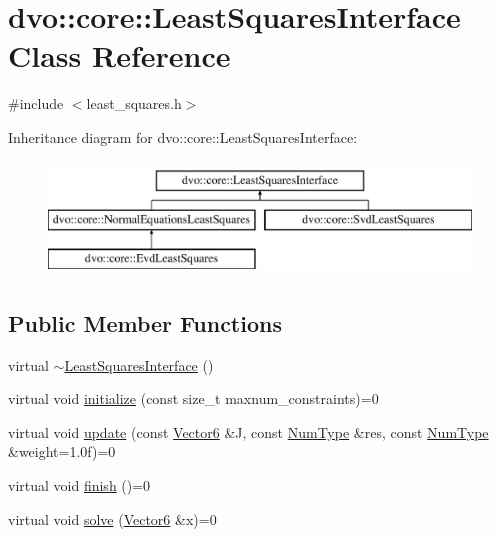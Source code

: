 \hypertarget{classdvo_1_1core_1_1_least_squares_interface}{}\section{dvo\+:\+:core\+:\+:Least\+Squares\+Interface Class Reference}
\label{classdvo_1_1core_1_1_least_squares_interface}


{\ttfamily \#include $<$least\+\_\+squares.\+h$>$}

Inheritance diagram for dvo\+:\+:core\+:\+:Least\+Squares\+Interface\+:\begin{figure}[H]
\begin{center}
\leavevmode
\includegraphics[height=3.000000cm]{classdvo_1_1core_1_1_least_squares_interface}
\end{center}
\end{figure}
\subsection*{Public Member Functions}
\begin{DoxyCompactItemize}
\item 
virtual \mbox{\hyperlink{classdvo_1_1core_1_1_least_squares_interface_afa584f0c27bbcf40a748d678b5295325}{$\sim$\+Least\+Squares\+Interface}} ()
\item 
virtual void \mbox{\hyperlink{classdvo_1_1core_1_1_least_squares_interface_a09e5784f74d7352a9550a8aa523d30d7}{initialize}} (const size\+\_\+t maxnum\+\_\+constraints)=0
\item 
virtual void \mbox{\hyperlink{classdvo_1_1core_1_1_least_squares_interface_a5f5cc1c312a01ff4e7ca91e90a73ccf3}{update}} (const \mbox{\hyperlink{namespacedvo_1_1core_a05327f3312d32a301bce9fccda9e5807}{Vector6}} \&J, const \mbox{\hyperlink{namespacedvo_1_1core_ab9c199d221775a923e2549ad7e15c323}{Num\+Type}} \&res, const \mbox{\hyperlink{namespacedvo_1_1core_ab9c199d221775a923e2549ad7e15c323}{Num\+Type}} \&weight=1.\+0f)=0
\item 
virtual void \mbox{\hyperlink{classdvo_1_1core_1_1_least_squares_interface_a2e580a70e96f0e7d6d70f6047891a42a}{finish}} ()=0
\item 
virtual void \mbox{\hyperlink{classdvo_1_1core_1_1_least_squares_interface_a3e2b3c894c5286fdee79316e6fa4d691}{solve}} (\mbox{\hyperlink{namespacedvo_1_1core_a05327f3312d32a301bce9fccda9e5807}{Vector6}} \&x)=0
\end{DoxyCompactItemize}


